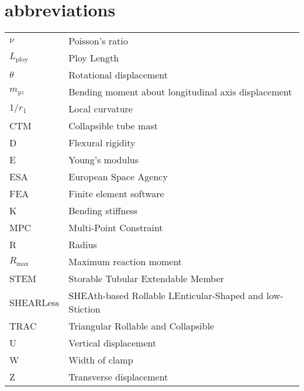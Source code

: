 \section*{abbreviations}
\begin{table}[!hbt]
\centering
	    \begin{tabular}{l l}
	   $\nu$        & Poisson's ratio  \\
	  $ L_{\mathrm{ploy}}$   & Ploy Length \\
	   $\theta$     & Rotational displacement \\
	   $m_{yz}$     & Bending moment about longitudinal axis displacement \\
    $1/r_1$         & Local curvature \\
	   CTM          & Collapsible tube mast\\
	   D            & Flexural rigidity \\
	   E            & Young's modulus \\
	   ESA          & European Space Agency \\
	   FEA          & Finite element software \\
	   K            & Bending stiffness \\ 
       MPC          & Multi-Point Constraint \\
	   R            & Radius \\	   
	   $R_{\mathrm{max}}$& Maximum reaction moment \\
	   STEM         & Storable Tubular Extendable Member \\
	   SHEARLess    & SHEAth-based Rollable LEnticular-Shaped and low-Stiction \\
	   TRAC         & Triangular Rollable and Collapsible \\
	   U            & Vertical displacement \\
	   W            & Width of clamp \\
       Z            & Transverse displacement \\
    \end{tabular}
	\end{table}
	